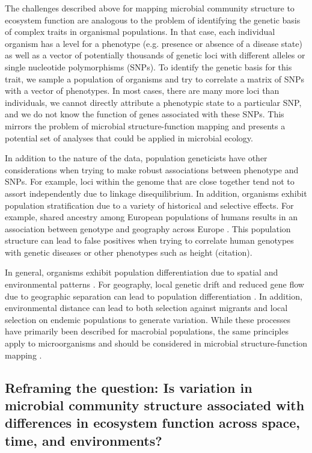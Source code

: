 \documentclass{article}
\begin{document}
The challenges described above for mapping microbial community structure to
ecosystem function are analogous to the problem of identifying the
genetic basis of complex traits in organismal populations. In that case,
each individual organism has a level for a phenotype (e.g. presence
or absence of a disease state) as well as a vector of potentially
thousands of genetic loci with different alleles or single nucleotide
polymorphisms (SNPs). To identify the genetic basis for this trait, we sample
a population of organisms and try to correlate a matrix of SNPs with a
vector of phenotypes. In most cases, there are many more loci than
individuals, we cannot directly attribute a phenotypic state to a particular
SNP, and we do not know the function of genes associated with these
SNPs. This mirrors the problem of microbial structure-function mapping
and presents a potential set of analyses that could be applied in
microbial ecology.

In addition to the nature of the data, population geneticists have other
considerations when trying to make robust associations between phenotype
and SNPs. For example, loci within the genome that are close together tend
not to assort independently due to linkage disequilibrium. In addition,
organisms exhibit population stratification due to a variety of historical
and selective effects. For example, shared ancestry among European
populations of humans results in an association between genotype and
geography across Europe \citep{novembre2008}. This population structure
can lead to false positives when trying to correlate human genotypes
with genetic diseases or other phenotypes such as height (citation).

In general, organisms exhibit population differentiation due to spatial
and environmental patterns \citep{wright1943}. For geography, local genetic
drift and reduced gene flow due to geographic separation can lead to population
differentiation \citep{wright1943}. In addition, environmental distance can lead to both selection
against migrants \citep{hendry2004} and local selection on endemic populations to
generate variation. While
these processes have primarily been described for macrobial populations, the
same principles apply to microorganisms and should be considered
in microbial structure-function mapping \citep{martiny2006}. 

\subsection{Reframing the question: Is variation in microbial community
structure associated with differences in ecosystem function across space,
time, and environments?}
\end{document}

